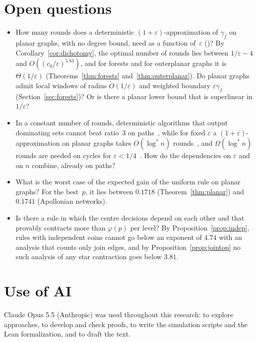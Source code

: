 \documentclass[11pt]{article}
\theoremstyle{remark}
\begin{document}
\section{Open questions}\label{sec:open}
\begin{itemize}
\item How many rounds does a deterministic $(1+\varepsilon)$-approximation of $\gamma_f$ on planar
  graphs, with no degree bound, need as a function of~$\varepsilon$ (\cite[Open Problem~3]{AS26})?
  By Corollary~\ref{cor:dichotomy}, the
  optimal number of rounds lies between $1/\varepsilon-4$ and $O((c_0/\varepsilon)^{5.83})$, and for
  forests and for outerplanar graphs it is $\Theta(1/\varepsilon)$
  (Theorems~\ref{thm:forests} and~\ref{thm:outerplanar}). Do planar graphs admit local
  windows of radius $\tilde O(1/\varepsilon)$ and weighted boundary $\varepsilon\gamma_f$
  (Section~\ref{sec:forests})? Or is there a planar lower bound that is superlinear in
  $1/\varepsilon$?
\item In a constant number of rounds, deterministic algorithms that output dominating sets cannot
  beat ratio~$3$ on paths~\cite[Thm.~8.7]{AS26}, while for fixed $\varepsilon$ a
  $(1+\varepsilon)$-approximation on planar graphs takes $O(\log^*n)$ rounds~\cite{CHW08}, and
  $\Omega(\log^*n)$ rounds are needed on cycles for $\varepsilon<1/4$~\cite[Prop.~C.1]{ASW26}. How do
  the dependencies on $\varepsilon$ and on $n$ combine, already on paths?
\item What is the worst case of the expected gain of the uniform rule on planar graphs? For the
  best~$p$, it lies between $0.1718$ (Theorem~\ref{thm:planar}) and $0.1741$ (Apollonian networks).
\item Is there a rule in which the centre decisions depend on each other and that provably contracts
  more than $\varphi(p)$ per level? By Proposition~\ref{prop:indep}, rules with independent coins
  cannot go below an exponent of $4.74$ with an analysis that counts only join edges, and by
  Proposition~\ref{prop:jointop} no such analysis of any star contraction goes below $3.81$.
\end{itemize}

\section*{Use of AI}

Claude Opus 5.5 (Anthropic) was used throughout this research: to explore approaches, to develop
and check proofs, to write the simulation scripts and the Lean formalization, and to draft the
text.
\end{document}
